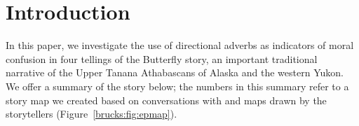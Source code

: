 



\def\authorlast{Brucks \& Lovick}

\renewcommand{\beginchapter}{\pageref{brucks-ch-begin}}
\renewcommand{\finishchapter}{\pageref{brucks-ch-end}}
\label{brucks:brucks-ch-begin}



\thispagestyle{firststyle}








\section{Introduction}
\label{brucks:section:introduction}

In this paper, we investigate the use of directional adverbs as indicators of moral confusion in four tellings of the Butterfly story, an important traditional narrative of the Upper Tanana Athabascans of Alaska and the western Yukon. We offer a summary of the story below; the numbers in this summary refer to a story map we created based on conversations with and maps drawn by the storytellers (Figure~\ref{brucks:fig:epmap}).

